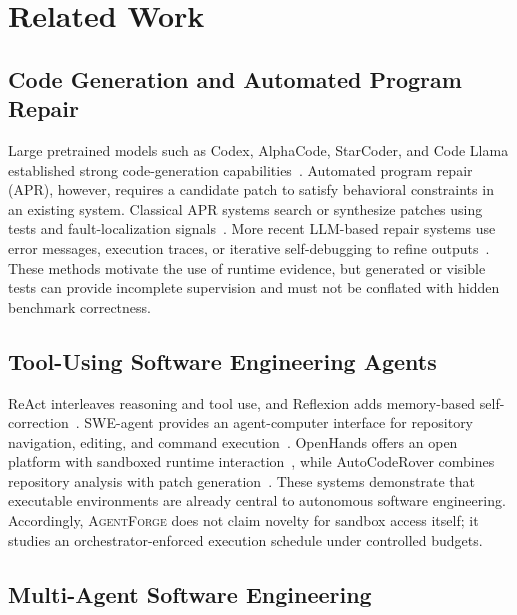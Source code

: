 \documentclass[journal]{IEEEtran}
\newcommand{\agentforge}{\textsc{AgentForge}}
\begin{document}
\section{Related Work}
\label{sec:related}

\subsection{Code Generation and Automated Program Repair}

Large pretrained models such as Codex, AlphaCode, StarCoder, and Code Llama established strong code-generation capabilities~\cite{chen2021codex,li2022alphacode,li2023starcoder,roziere2023codellama}. Automated program repair (APR), however, requires a candidate patch to satisfy behavioral constraints in an existing system. Classical APR systems search or synthesize patches using tests and fault-localization signals~\cite{le2012genprog}. More recent LLM-based repair systems use error messages, execution traces, or iterative self-debugging to refine outputs~\cite{xia2022less,jin2023inferfix,fan2023automated,chen2023teaching,olausson2023selfrepair}. These methods motivate the use of runtime evidence, but generated or visible tests can provide incomplete supervision and must not be conflated with hidden benchmark correctness.

\subsection{Tool-Using Software Engineering Agents}

ReAct interleaves reasoning and tool use, and Reflexion adds memory-based self-correction~\cite{yao2023react,shinn2023reflexion}. SWE-agent provides an agent-computer interface for repository navigation, editing, and command execution~\cite{yang2024sweagent}. OpenHands offers an open platform with sandboxed runtime interaction~\cite{wang2024openhands}, while AutoCodeRover combines repository analysis with patch generation~\cite{zhang2024autocoderover}. These systems demonstrate that executable environments are already central to autonomous software engineering. Accordingly, \agentforge{} does not claim novelty for sandbox access itself; it studies an orchestrator-enforced execution schedule under controlled budgets.

\subsection{Multi-Agent Software Engineering}
\end{document}
